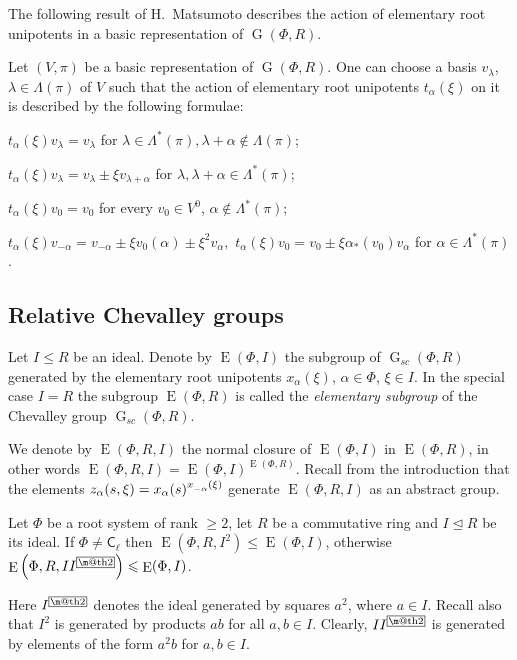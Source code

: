 \documentclass[12pt]{amsart}
\makeatletter
\numberwithin{equation}{section}
\theoremstyle{definition}
\DeclareMathOperator{\G}{G}
\DeclareMathOperator{\E}{E}
\newcommand{\rC}{\mathsf{C}}
\newcommand{\indexbox}[1]{\text{\fboxsep=.1em\fbox{\m@th$\displaystyle#1$}}}
\def\ssub#1{\mathchoice
   {_{\lower2pt\hbox{$\scriptstyle #1$}}}
   {_{\lower2pt\hbox{$\scriptstyle #1$}}}
   {_{\lower1.5pt\hbox{$\scriptscriptstyle #1$}}}
   {_{\!\lower1.5pt\hbox{$\scriptscriptstyle #1$}}}}
\makeatother
\begin{document}
The following result of H.~Matsumoto describes the action of elementary root unipotents in a basic representation of $\G(\Phi, R)$.
\begin{lemma}[{\cite[Lemma~2.3]{Ma69}}]\label{lemma:Matsumoto}
 Let $(V, \pi)$ be a basic representation of $\G(\Phi, R)$.
 One can choose a basis $v_\lambda$, $\lambda\in\Lambda(\pi)$ of $V$ such that the action of elementary root unipotents $t_\alpha(\xi)$ on it is described by the following formulae:
 \begin{thmlist}
  \item $t_{\alpha}(\xi) v_\lambda = v_\lambda$ for $\lambda\in\Lambda^*(\pi), \lambda+\alpha\not\in\Lambda(\pi)$;
  \item $t_\alpha(\xi)v_\lambda=v_\lambda\pm\xi v_{\lambda+\alpha}$ for $\lambda,\lambda+\alpha\in\Lambda^*(\pi)$;
  \item $t_\alpha(\xi)v_0 = v_0$ for every $v_0\in V^0$, $\alpha\not\in\Lambda^*(\pi)$;
  \item $t_\alpha(\xi)v_{-\alpha}=v_{-\alpha}\pm\xi v_0(\alpha)\pm\xi^2 v_{\alpha},$ $t_\alpha(\xi)v_0 = v_0\pm\xi\alpha_*(v_0)v_\alpha$ for $\alpha\in\Lambda^*(\pi)$.
 \end{thmlist}
\end{lemma}

\subsection{Relative Chevalley groups}\label{sec:relative-elementary}
Let $I\leq R$ be an ideal. Denote by $\E(\Phi, I)$ the subgroup of $\G_{sc}(\Phi, R)$ generated by the elementary root unipotents $x_\alpha(\xi)$, $\alpha\in\Phi$, $\xi\in I$.
In the special case $I=R$ the subgroup $\E(\Phi, R)$ is called the {\it elementary subgroup} of the Chevalley group $\G_{sc}(\Phi, R)$.

We denote by $\E(\Phi, R, I)$ the normal closure of $\E(\Phi, I)$ in $\E(\Phi, R)$, in other words $\E(\Phi, R, I) = \E(\Phi, I)^{\E(\Phi, R)}$.
Recall from the introduction that the elements $z_\alpha(s, \xi) = x_\alpha(s)^{x\ssub{-\alpha}(\xi)}$ generate $\E(\Phi, R, I)$ as an abstract group.

\begin{lemma}[{\cite[Corollary~3.3]{S}}]\label{lemma:Stepanov-ideal}
Let $\Phi$ be a root system of rank $\geqslant2$, let $R$ be a commutative ring and $I\trianglelefteq R$ be its ideal.
If $\Phi\neq\rC_\ell$ then $\E\left(\Phi,R,I^2\right)\leqslant\E(\Phi,I)$, otherwise $\E\left(\Phi,R,II^{\indexbox{2}}\right)\leqslant\E(\Phi,I)$.
\end{lemma}
Here $I^{\indexbox{2}}$ denotes the ideal generated by squares $a^2$, where $a\in I$.
Recall also that $I^2$ is generated by products $ab$ for all $a,b\in I$.
Clearly, $II^{\indexbox{2}}$ is generated by elements of the form $a^2b$ for $a,b\in I$.
\end{document}
